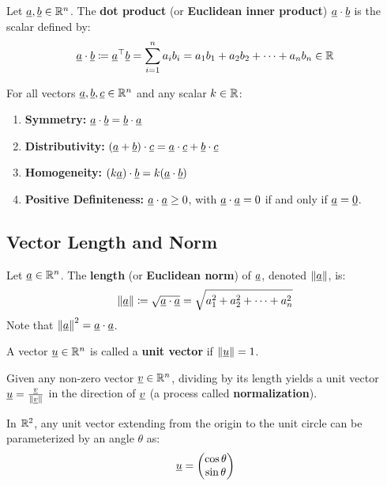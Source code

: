 \begin{definition}
    Let $\underline{a}, \underline{b} \in \mathbb{R}^n$. The \textbf{dot product} (or \textbf{Euclidean inner product}) $\underline{a} \cdot \underline{b}$ is the scalar defined by:
    \[
        \underline{a} \cdot \underline{b} \coloneqq \underline{a}^{\top} \underline{b} = \sum_{i=1}^{n} a_i b_i = a_1 b_1 + a_2 b_2 + \dots + a_n b_n \in \mathbb{R}
    \]
\end{definition}

\begin{theorem}
    For all vectors $\underline{a}, \underline{b}, \underline{c} \in \mathbb{R}^n$ and any scalar $k \in \mathbb{R}$:
    \begin{enumerate}[label=\roman*.]
        \item \textbf{Symmetry:} $\underline{a} \cdot \underline{b} = \underline{b} \cdot \underline{a}$
        \item \textbf{Distributivity:} $(\underline{a} + \underline{b}) \cdot \underline{c} = \underline{a} \cdot \underline{c} + \underline{b} \cdot \underline{c}$
        \item \textbf{Homogeneity:} $(k\underline{a}) \cdot \underline{b} = k(\underline{a} \cdot \underline{b})$
        \item \textbf{Positive Definiteness:} $\underline{a} \cdot \underline{a} \ge 0$, with $\underline{a} \cdot \underline{a} = 0$ if and only if $\underline{a} = \underline{0}$.
    \end{enumerate}
\end{theorem}

\subsection{Vector Length and Norm}

\begin{definition}
    Let $\underline{a} \in \mathbb{R}^n$. The \textbf{length} (or \textbf{Euclidean norm}) of $\underline{a}$, denoted $\left\| \underline{a} \right\|$, is:
    \[
        \left\| \underline{a} \right\| \coloneqq \sqrt{\underline{a} \cdot \underline{a}} = \sqrt{a_1^2 + a_2^2 + \dots + a_n^2}
    \]
    Note that $\left\| \underline{a} \right\|^2 = \underline{a} \cdot \underline{a}$.
\end{definition}

\begin{definition}
    A vector $\underline{u} \in \mathbb{R}^n$ is called a \textbf{unit vector} if $\left\| \underline{u} \right\| = 1$.
    
    Given any non-zero vector $\underline{v} \in \mathbb{R}^n$, dividing by its length yields a unit vector $\underline{u} = \frac{\underline{v}}{\left\| \underline{v} \right\|}$ in the direction of $\underline{v}$ (a process called \textbf{normalization}).
    
    In $\mathbb{R}^2$, any unit vector extending from the origin to the unit circle can be parameterized by an angle $\theta$ as:
    \[
        \underline{u} = \begin{pmatrix} \cos\theta \\ \sin\theta \end{pmatrix}
    \]
\end{definition}

